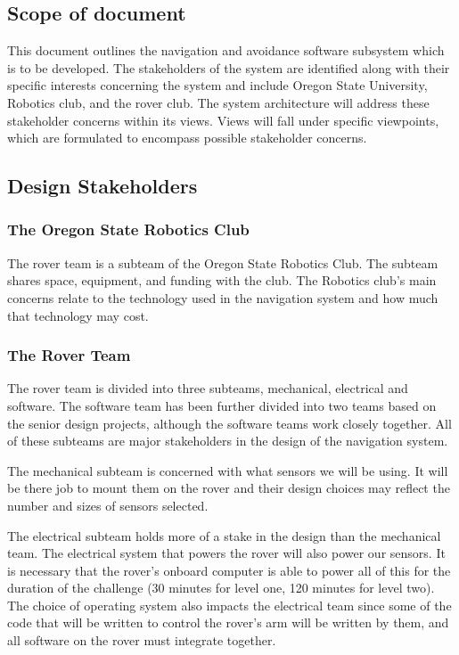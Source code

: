 \documentclass[10pt, oneside,onecolumn]{IEEEtran}
\begin{document}
\begin{titlepage}
\subsection{Scope of document}

This document outlines the navigation and avoidance software subsystem which is to be developed. The stakeholders of the system are identified along with their specific interests concerning the system and include Oregon State University, Robotics club, and the rover club. The system architecture will address these stakeholder concerns within its views. Views will fall under specific viewpoints, which are formulated to encompass possible stakeholder concerns. 

\subsection{Design Stakeholders}

\subsubsection{The Oregon State Robotics Club}

The rover team is a subteam of the Oregon State Robotics Club. The subteam shares space, equipment, and funding with the club. The Robotics club's main concerns relate to the technology used in the navigation system and how much that technology may cost. 

\subsubsection{The Rover Team}

The rover team is divided into three subteams, mechanical, electrical and software. The software team has been further divided into two teams based on the senior design projects, although the software teams work closely together. All of these subteams are major stakeholders in the design of the navigation system. 

The mechanical subteam is concerned with what sensors we will be using. It will be there job to mount them on the rover and their design choices may reflect the number and sizes of sensors selected. 

The electrical subteam holds more of a stake in the design than the mechanical team. The electrical system that powers the rover will also power our sensors. It is necessary that the rover's onboard computer is able to power all of this for the duration of the challenge (30 minutes for level one, 120 minutes for level two). The choice of operating system also impacts the electrical team since some of the code that will be written to control the rover's arm will be written by them, and all software on the rover must integrate together. 


\end{titlepage}
\end{document}
